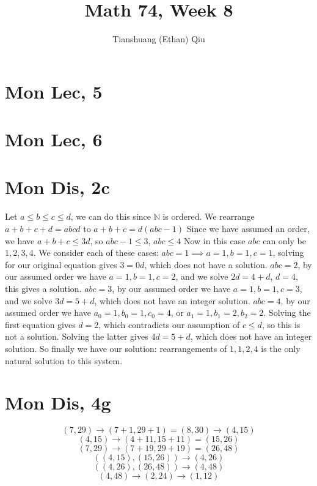 \documentclass[12pt]{article}
\author{Tianshuang (Ethan) Qiu}
\newcommand{\N}{\mathbb{N}}
\begin{document}
\title{Math 74, Week 8}
\maketitle
\section{Mon Lec, 5}


\section{Mon Lec, 6}



\section{Mon Dis, 2c}
Let $a\leq b \leq c \leq d$, we can do this since $\N$ is ordered. We rearrange $a+b+c+d = abcd$ to $a+b+c = d(abc-1)$
\newline
Since we have assumed an order, we have $a+b+c \leq 3d$, so $abc-1 \leq 3$, $abc \leq 4$
\newline
Now in this case $abc$ can only be $1,2,3,4$. We consider each of these cases:
\newline
$abc = 1 \implies a=1, b=1, c=1$, solving for our original equation gives $3 = 0d$, which does not have a solution.
\newline
$abc = 2$, by our assumed order we have $a=1, b=1, c=2$, and we solve $2d=4+d$, $d=4$, this gives a solution.
\newline
$abc = 3$, by our assumed order we have $a=1, b=1, c=3$, and we solve $3d=5+d$, which does not have an integer solution.
\newline
$abc = 4$, by our assumed order we have $a_0=1, b_0=1, c_0=4$, or $a_1=1, b_1 = 2, b_2=2$. Solving the first equation gives $d = 2$, which contradicts our assumption of $c \leq d$, so this is not a solution. Solving the latter gives $4d = 5+d$, which does not have an integer solution.
\newline
So finally we have our solution: rearrangements of $1,1,2,4$ is the only natural solution to this system.

\section{Mon Dis, 4g}
$$(7,29) \to (7+1,29+1) = (8, 30) \to (4, 15)$$
$$(4,15) \to (4+11, 15+11) = (15, 26)$$
$$(7,29) \to (7+19, 29+19) = (26, 48)$$
$$((4, 15), (15,26)) \to (4, 26)$$
$$((4,26), (26,48)) \to (4,48)$$
$$(4, 48) \to (2, 24) \to (1, 12)$$
\end{document}
